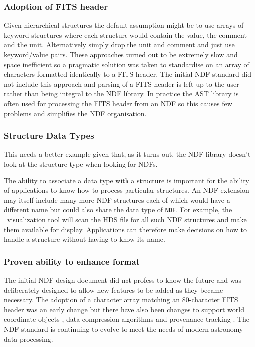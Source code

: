 \documentclass[final,authoryear,5p,times,twocolumn]{elsarticle}
\begin{document}
\subsubsection{Adoption of FITS header}

Given hierarchical structures the default assumption might be to use
arrays of keyword structures where each structure would contain the
value, the comment and the unit. Alternatively simply drop the unit
and comment and just use keyword/value pairs. These approaches turned
out to be extremely slow and space inefficient so a pragmatic solution
was taken to standardise on an array of characters formatted
identically to a FITS header. The initial NDF standard did not include
this approach and parsing of a FITS header is left up to the user
rather than being integral to the NDF library. In practice the AST
library \citep{1998ASPC..145...41W} is often used for processing the FITS
header from an NDF so this causes few problems and simplifies the NDF
organization.

\subsubsection{Structure Data Types}

{\color{red} This needs a better example given that, as it turns out,
  the NDF library doesn't look at the structure type when looking for NDFs.}

The ability to associate a data type with a structure is important for
the ability of applications to know how to process particular
structures. An NDF extension may itself include many more NDF
structures each of which would have a different name but could also
share the data type of \texttt{NDF}. For example, the \gaia\
visualization tool \citep{2009ASPC..411..575D} will scan the HDS file
for all such NDF structures and make them available for
display. Applications can therefore make decisions on how to handle a
structure without having to know its name.

\subsubsection{Proven ability to enhance format}

The initial NDF design document did not profess to know the future and
was deliberately designed to allow new features to be added as they
became necessary. The adoption of a character array matching an
80-character FITS header was an early change but there have also been
changes to support world coordinate objects
\citep{2001ASPC..238..129B}, data compression algorithms
\citep{2008ASPC..394..650C} and provenance tracking
\citep{2009ASPC..411..418J}. The NDF standard is continuing to evolve
to meet the needs of modern astronomy data processing.
\end{document}
